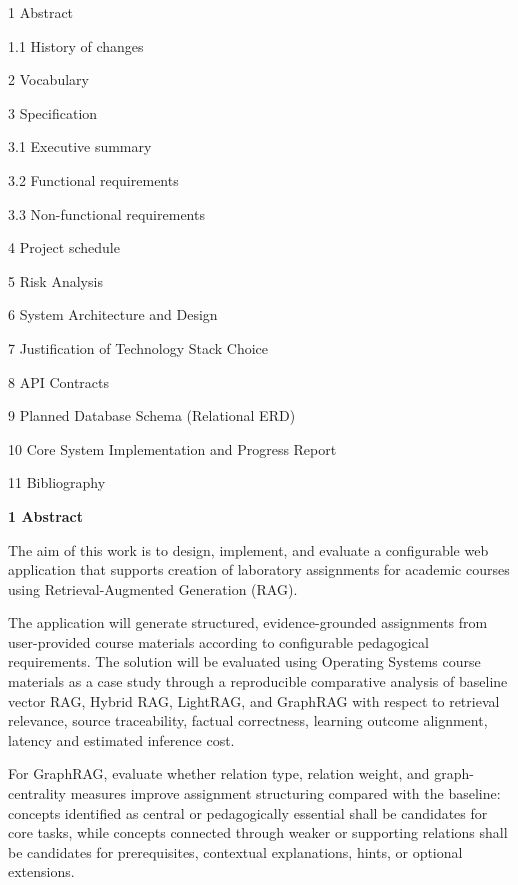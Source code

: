 \documentclass[12pt,a4paper]{article}
\newcommand{\TOCEntry}[3][0pt]{%
    \noindent
    \hspace*{#1}%
    \parbox[t]{0.80\textwidth}{#2}%
    \hfill
    #3\par
    \vspace{2mm}
}
\begin{document}
\TOCEntry{1 Abstract}{\pageref{sec:abstract}}
\TOCEntry[1em]{1.1 History of changes}{\pageref{sec:history}}
\TOCEntry{2 Vocabulary}{\pageref{sec:vocabulary}}
\TOCEntry{3 Specification}{\pageref{sec:specification}}
\TOCEntry[1em]{3.1 Executive summary}{\pageref{sec:executive-summary}}
\TOCEntry[1em]{3.2 Functional requirements}{\pageref{sec:functional-requirements}}
\TOCEntry[1em]{3.3 Non-functional requirements}{\pageref{sec:nonfunctional-requirements}}
\TOCEntry{4 Project schedule}{\pageref{sec:schedule}}
\TOCEntry{5 Risk Analysis}{\pageref{sec:risk}}
\TOCEntry{6 System Architecture and Design}{\pageref{sec:architecture}}
\TOCEntry{7 Justification of Technology Stack Choice}{\pageref{sec:technology-stack}}
\TOCEntry{8 API Contracts}{\pageref{sec:api-contracts}}
\TOCEntry{9 Planned Database Schema (Relational ERD)}{\pageref{sec:database-schema}}
\TOCEntry{10 Core System Implementation and Progress Report}{\pageref{sec:implementation}}
\TOCEntry{11 Bibliography}{\pageref{sec:bibliography}}

\clearpage

\thispagestyle{fancy}

\noindent
{\Large\bfseries\textcolor{blue!55!black}{1 Abstract}\par}
\label{sec:abstract}

\vspace{12mm}

The aim of this work is to design, implement, and evaluate a configurable web application that supports creation of laboratory assignments for academic courses using Retrieval-Augmented Generation (RAG).

The application will generate structured, evidence-grounded assignments from user-provided course materials according to configurable pedagogical requirements. The solution will be evaluated using Operating Systems course materials as a case study through a reproducible comparative analysis of baseline vector RAG, Hybrid RAG, LightRAG, and GraphRAG with respect to retrieval relevance, source traceability, factual correctness, learning outcome alignment, latency and estimated inference cost.

For GraphRAG, evaluate whether relation type, relation weight, and graph-centrality measures improve assignment structuring compared with the baseline: concepts identified as central or pedagogically essential shall be candidates for core tasks, while concepts connected through weaker or supporting relations shall be candidates for prerequisites, contextual explanations, hints, or optional extensions.
\end{document}

